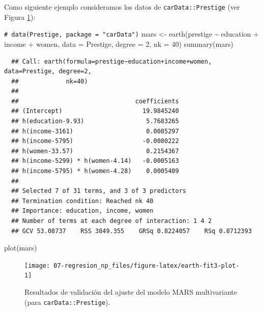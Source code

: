 \documentclass[
]{book}
\newenvironment{Shaded}{\begin{snugshade}}{\end{snugshade}}
\newcommand{\AttributeTok}[1]{\textcolor[rgb]{0.77,0.63,0.00}{#1}}
\newcommand{\CommentTok}[1]{\textcolor[rgb]{0.56,0.35,0.01}{\textit{#1}}}
\newcommand{\DecValTok}[1]{\textcolor[rgb]{0.00,0.00,0.81}{#1}}
\newcommand{\FunctionTok}[1]{\textcolor[rgb]{0.00,0.00,0.00}{#1}}
\newcommand{\NormalTok}[1]{#1}
\newcommand{\OtherTok}[1]{\textcolor[rgb]{0.56,0.35,0.01}{#1}}
\newcommand{\SpecialCharTok}[1]{\textcolor[rgb]{0.00,0.00,0.00}{#1}}
\theoremstyle{break}
\theoremstyle{nonumberplain}
\renewcommand{\CommentTok}[1]{\textcolor[rgb]{0.41,0.41,0.41}{\texttt{#1}}}
\begin{document}
Como siguiente ejemplo consideramos los datos de \texttt{carData::Prestige} (ver Figura \ref{fig:earth-fit3-plot}):



\begin{Shaded}
\begin{Highlighting}[]
\CommentTok{\# data(Prestige, package = "carData")}
\NormalTok{mars }\OtherTok{\textless{}{-}} \FunctionTok{earth}\NormalTok{(prestige }\SpecialCharTok{\textasciitilde{}}\NormalTok{ education }\SpecialCharTok{+}\NormalTok{ income }\SpecialCharTok{+}\NormalTok{ women, }\AttributeTok{data =}\NormalTok{ Prestige,}
              \AttributeTok{degree =} \DecValTok{2}\NormalTok{, }\AttributeTok{nk =} \DecValTok{40}\NormalTok{)}
\FunctionTok{summary}\NormalTok{(mars)}
\end{Highlighting}
\end{Shaded}

\begin{verbatim}
  ## Call: earth(formula=prestige~education+income+women, data=Prestige, degree=2,
  ##             nk=40)
  ## 
  ##                                coefficients
  ## (Intercept)                      19.9845240
  ## h(education-9.93)                 5.7683265
  ## h(income-3161)                    0.0085297
  ## h(income-5795)                   -0.0080222
  ## h(women-33.57)                    0.2154367
  ## h(income-5299) * h(women-4.14)   -0.0005163
  ## h(income-5795) * h(women-4.28)    0.0005409
  ## 
  ## Selected 7 of 31 terms, and 3 of 3 predictors
  ## Termination condition: Reached nk 40
  ## Importance: education, income, women
  ## Number of terms at each degree of interaction: 1 4 2
  ## GCV 53.08737    RSS 3849.355    GRSq 0.8224057    RSq 0.8712393
\end{verbatim}

\begin{Shaded}
\begin{Highlighting}[]
\FunctionTok{plot}\NormalTok{(mars)}
\end{Highlighting}
\end{Shaded}

\begin{figure}[!htb]

{\centering \texttt{[image: 07-regresion\_np\_files/figure-latex/earth-fit3-plot-1]} 

}

\caption{Resultados de validación del ajuste del modelo MARS multivariante (para \texttt{carData::Prestige}).}\label{fig:earth-fit3-plot}
\end{figure}
\end{document}
